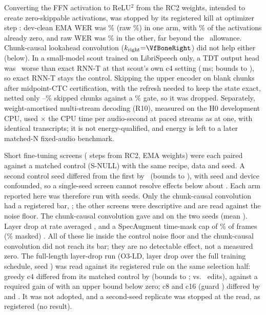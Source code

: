  Converting the FFN activation to ReLU$^2$ from the RC2 weights, intended to create zero-skippable activations,
was stopped by its registered kill at optimizer step \VfReluKillStep: dev-clean EMA WER was \VfReluOneEma\% (raw \VfReluOneRaw\%) in one
arm, with \VfReluOneZero\% of the activations already zero, and raw WER was \VfReluTwoRaw\% in the other, far beyond the
\VfReluKillPp\pp\ allowance. Chunk-causal lookahead convolution ($k_\mathrm{right}{=}\VfBoneRight$) did not help either (below). In a small-model scout trained on LibriSpeech only, a TDT output head was
\VfTdtDelta\pp\ worse than exact RNN-T at that scout's own c4 setting (\VfTdtChunkMs\,ms; bounds \VfTdtLo{} to \VfTdtHi\pp), so exact RNN-T stays the control.
Skipping the upper encoder on blank chunks after midpoint-CTC certification, with the refresh needed to keep the state exact,
netted only \VfSkipLo--\VfSkipHi\% skipped chunks against a \VfSkipGate\% gate, so it was dropped. Separately, weight-amortised
multi-stream decoding (R10), measured on the H0 development CPU, used \VfRtenRatio$\times$ the CPU time per audio-second at
\VfRtenStreams{} paced streams as at one, with identical transcripts; it is not energy-qualified, and energy is left to a later
matched-N fixed-audio benchmark.

 Short fine-tuning screens (\VfScreenSteps{} steps from RC2, EMA weights) were each paired
against a matched control (S-NULL) with the same recipe, data and seed. A second control seed differed from the first by
\VfFloorDelta\pp\ (bounds \VfFloorLo{} to \VfFloorHi\pp), with seed and device confounded, so a single-seed screen cannot resolve effects
below about \VfSingleSeedPp\pp. Each arm reported here was therefore run with \VfScreenSeeds{} seeds. Only the chunk-causal convolution had a registered
bar, \VfScreenBar\pp; the other screens were descriptive and are read against the noise floor.
The chunk-causal convolution gave \VfBoneSeedA\pp{} and \VfBoneSeedB\pp{} on the two seeds (mean \VfBoneMean\pp). Layer drop at rate \VfLdRate{} averaged \VfLdMean\pp, and a SpecAugment time-mask cap of \VfSpecCapPct\% of frames
(\VfSpecMaskedPct\% masked) \VfSpecMean\pp. All of these lie inside the control noise floor and the chunk-causal convolution did not reach its bar; they are
no detectable effect, not a measured zero. The full-length layer-drop run (O3-LD, layer drop \VfLdRate{} over the full training schedule, seed \VfSeed) was read against
its registered rule on the same selection half: greedy c4 differed from its matched control by \VfOThreeDelta\pp (bounds
\VfOThreeLo{} to \VfOThreeHi\pp; \VfOThreeEdits{} vs.\ \VfOThreeControlEdits{} edits), against a required gain of
\VfOThreeBar\pp with an upper bound below zero; c8 and c16 (guard \VfOThreeGuard\pp) differed by \VfOThreeEightDelta\pp and
\VfOThreeSixteenDelta\pp. It was not adopted, and a second-seed replicate was stopped at the read, as registered (no result).

